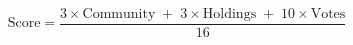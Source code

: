 \documentclass[border=10pt,preview]{standalone}
\begin{document}
\[
\text{Score}=\frac{3\times\text{Community}\;+\;3\times\text{Holdings}\;+\;10\times\text{Votes}}{16}
\]
\end{document}
